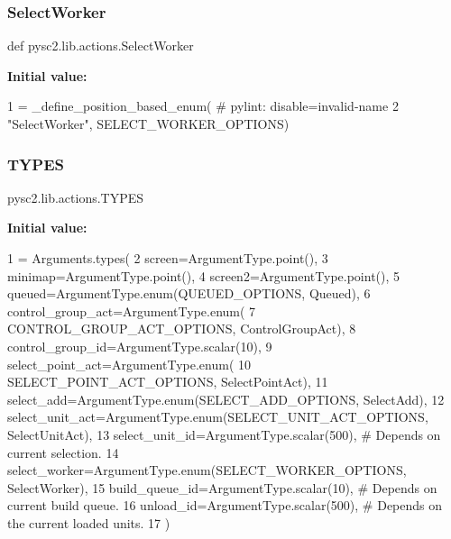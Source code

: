\subsubsection{\texorpdfstring{Select\+Worker}{SelectWorker}}
{\footnotesize\ttfamily def pysc2.\+lib.\+actions.\+Select\+Worker}

{\bfseries Initial value\+:}
\begin{DoxyCode}
1 =  \_define\_position\_based\_enum(  \textcolor{comment}{# pylint: disable=invalid-name}
2     \textcolor{stringliteral}{"SelectWorker"}, SELECT\_WORKER\_OPTIONS)
\end{DoxyCode}
\mbox{\label{namespacepysc2_1_1lib_1_1actions_aa7b257e76395d51bdbd857f48f82e9f9}} 
\subsubsection{\texorpdfstring{T\+Y\+P\+ES}{TYPES}}
{\footnotesize\ttfamily pysc2.\+lib.\+actions.\+T\+Y\+P\+ES}

{\bfseries Initial value\+:}
\begin{DoxyCode}
1 =  Arguments.types(
2     screen=ArgumentType.point(),
3     minimap=ArgumentType.point(),
4     screen2=ArgumentType.point(),
5     queued=ArgumentType.enum(QUEUED\_OPTIONS, Queued),
6     control\_group\_act=ArgumentType.enum(
7         CONTROL\_GROUP\_ACT\_OPTIONS, ControlGroupAct),
8     control\_group\_id=ArgumentType.scalar(10),
9     select\_point\_act=ArgumentType.enum(
10         SELECT\_POINT\_ACT\_OPTIONS, SelectPointAct),
11     select\_add=ArgumentType.enum(SELECT\_ADD\_OPTIONS, SelectAdd),
12     select\_unit\_act=ArgumentType.enum(SELECT\_UNIT\_ACT\_OPTIONS, SelectUnitAct),
13     select\_unit\_id=ArgumentType.scalar(500),  \textcolor{comment}{# Depends on current selection.}
14     select\_worker=ArgumentType.enum(SELECT\_WORKER\_OPTIONS, SelectWorker),
15     build\_queue\_id=ArgumentType.scalar(10),  \textcolor{comment}{# Depends on current build queue.}
16     unload\_id=ArgumentType.scalar(500),  \textcolor{comment}{# Depends on the current loaded units.}
17 )
\end{DoxyCode}
